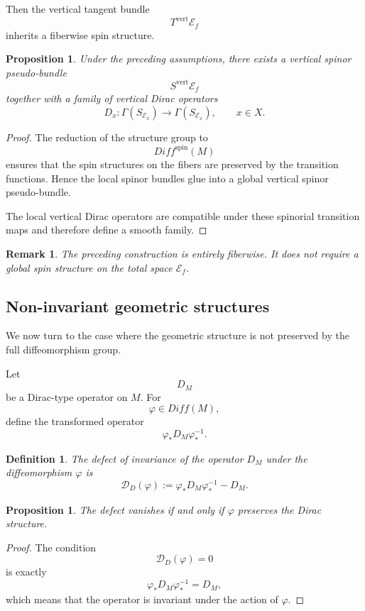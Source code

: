 \documentclass[11pt]{amsart}
\newtheorem{proposition}[theorem]{Proposition}
\newtheorem{definition}[theorem]{Definition}
\newtheorem{remark}[theorem]{Remark}
\begin{document}
Then the vertical tangent bundle
\[
T^{\mathrm{vert}}\mathcal E_f
\]
inherits a fiberwise spin structure.

\begin{proposition}
Under the preceding assumptions, there exists a vertical spinor pseudo-bundle
\[
S^{\mathrm{vert}}\mathcal E_f
\]
together with a family of vertical Dirac operators
\[
D_x:
\Gamma(S_{\mathcal E_x})
\longrightarrow
\Gamma(S_{\mathcal E_x}),
\qquad x\in X.
\]
\end{proposition}

\begin{proof}
The reduction of the structure group to
\[
Diff^{\mathrm{spin}}(M)
\]
ensures that the spin structures on the fibers are preserved by the transition
functions. Hence the local spinor bundles glue into a global vertical spinor
pseudo-bundle.

The local vertical Dirac operators are compatible under these spinorial
transition maps and therefore define a smooth family.
\end{proof}

\begin{remark}
The preceding construction is entirely fiberwise. It does not require a global
spin structure on the total space \(\mathcal E_f\).
\end{remark}

\subsection{Non-invariant geometric structures}

We now turn to the case where the geometric structure is not preserved by the
full diffeomorphism group.

Let
\[
D_M
\]
be a Dirac-type operator on \(M\). For
\[
\varphi\in Diff(M),
\]
define the transformed operator
\[
\varphi_*D_M\varphi_*^{-1}.
\]

\begin{definition}
The defect of invariance of the operator \(D_M\) under the diffeomorphism
\(\varphi\) is
\[
\mathcal D_D(\varphi)
:=
\varphi_*D_M\varphi_*^{-1}-D_M.
\]
\end{definition}

\begin{proposition}
The defect vanishes if and only if \(\varphi\) preserves the Dirac structure.
\end{proposition}

\begin{proof}
The condition
\[
\mathcal D_D(\varphi)=0
\]
is exactly
\[
\varphi_*D_M\varphi_*^{-1}=D_M,
\]
which means that the operator is invariant under the action of
\(\varphi\).
\end{proof}
\end{document}
